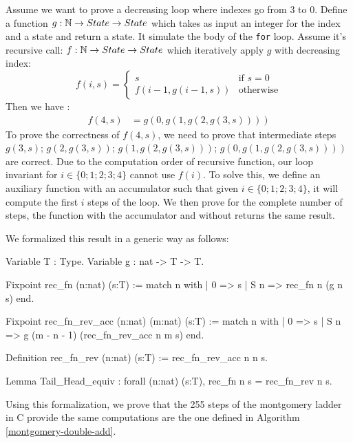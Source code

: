 Assume we want to prove a decreasing loop where indexes go from 3 to 0.
Define a function $g : \mathbb{N} \rightarrow State  \rightarrow State $ which takes as input an integer for the index and a state and return a state.
It simulate the body of the \texttt{for} loop.
Assume it's recursive call: $f : \mathbb{N} \rightarrow State \rightarrow State $ which iteratively apply $g$ with decreasing index:
\begin{equation*}
  f ( i , s ) =
  \begin{cases}
  s & \text{if } s = 0 \\
  f( i - 1 , g ( i - 1  , s )) & \text{otherwise}
  \end{cases}
\end{equation*}
Then we have :
\begin{align*}
  f(4,s) &= g(0,g(1,g(2,g(3,s))))
\end{align*}
To prove the correctness of $f(4,s)$, we need to prove that intermediate steps
$g(3,s)$; $g(2,g(3,s))$; $g(1,g(2,g(3,s)))$; $g(0,g(1,g(2,g(3,s))))$ are correct.
Due to the computation order of recursive function, our loop invariant for $i\in\{0;1;2;3;4\}$ cannot use $f(i)$.
To solve this, we define an auxiliary function with an accumulator such that given $i\in\{0;1;2;3;4\}$, it will compute the first $i$ steps of the loop.
We then prove for the complete number of steps, the function with the accumulator and without returns the same result.

We formalized this result in a generic way as follows:
\begin{Coq}
Variable T : Type.
Variable g : nat -> T -> T.

Fixpoint rec_fn (n:nat) (s:T) :=
  match n with
  | 0 => s
  | S n => rec_fn n (g n s)
  end.

Fixpoint rec_fn_rev_acc (n:nat) (m:nat) (s:T) :=
  match n with
  | 0 => s
  | S n => g (m - n - 1) (rec_fn_rev_acc n m s)
  end.

Definition rec_fn_rev (n:nat) (s:T) :=
  rec_fn_rev_acc n n s.

Lemma Tail_Head_equiv :
  forall (n:nat) (s:T),
  rec_fn n s = rec_fn_rev n s.
\end{Coq}
Using this formalization, we prove that the 255 steps of the montgomery ladder in C provide the same computations are the one defined in Algorithm \ref{montgomery-double-add}.
